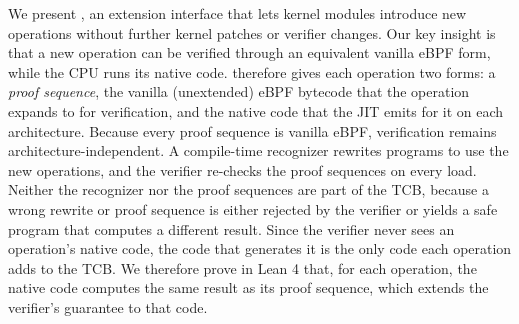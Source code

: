 We present \tool, an extension interface that lets kernel modules introduce new operations without further kernel patches or verifier changes.
Our key insight is that a new operation can be verified through an equivalent vanilla eBPF form, while the CPU runs its native code.
\tool therefore gives each operation two forms: a \emph{proof sequence}, the vanilla (unextended) eBPF bytecode that the operation expands to for verification, and the native code that the JIT emits for it on each architecture.
Because every proof sequence is vanilla eBPF, verification remains architecture-independent.
A compile-time recognizer rewrites programs to use the new operations, and the verifier re-checks the proof sequences on every load.
Neither the recognizer nor the proof sequences are part of the TCB, because a wrong rewrite or proof sequence is either rejected by the verifier or yields a safe program that computes a different result.
Since the verifier never sees an operation's native code, the code that generates it is the only code each operation adds to the TCB.
We therefore prove in Lean 4 that, for each operation, the native code computes the same result as its proof sequence, which extends the verifier's guarantee to that code.

